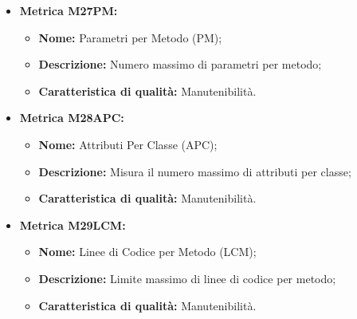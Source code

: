 \begin{itemize}
    \pagebreak
    \item \hypertarget{item:M27PM}{\textbf{Metrica M27PM:}}
    \vspace{0.2cm}
    
    \begin{minipage}[H]{0.9\textwidth}
        \begin{itemize}
            \item \textbf{Nome:} Parametri per Metodo (PM);
            \item \textbf{Descrizione:} Numero massimo di parametri per metodo;
            \item \textbf{Caratteristica di qualità:} Manutenibilità.
        \end{itemize}
    \end{minipage}

    \vspace{0.4cm}
    \item \hypertarget{item:M28APC}{\textbf{Metrica M28APC:}}
    \vspace{0.2cm}
    
    \begin{minipage}[H]{0.9\textwidth}
        \begin{itemize}
            \item \textbf{Nome:} Attributi Per Classe (APC);
            \item \textbf{Descrizione:} Misura il numero massimo di attributi per classe;
            \item \textbf{Caratteristica di qualità:} Manutenibilità.
        \end{itemize} 
    \end{minipage}

    \vspace{0.4cm}
    \item \hypertarget{item:M29LCM}{\textbf{Metrica M29LCM:}}
    \vspace{0.2cm}
        
    \begin{minipage}[H]{0.9\textwidth}
        \begin{itemize}
            \item \textbf{Nome:} Linee di Codice per Metodo (LCM);
            \item \textbf{Descrizione:} Limite massimo di linee di codice per metodo;
            \item \textbf{Caratteristica di qualità:} Manutenibilità.
        \end{itemize}
    \end{minipage} 


\end{itemize}
